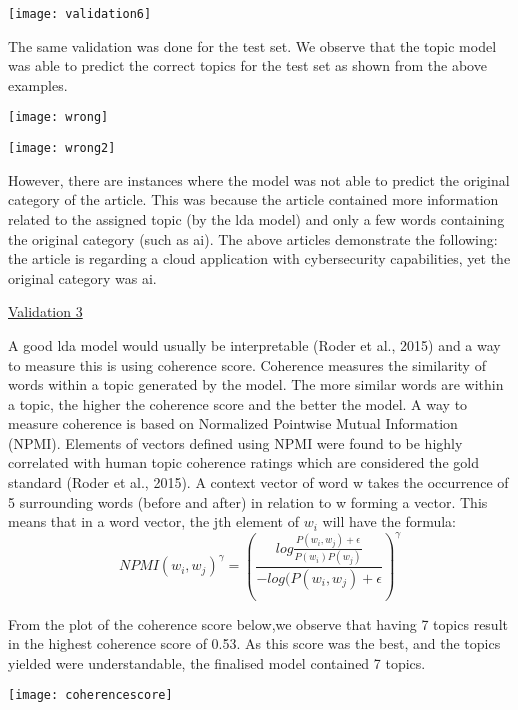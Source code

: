 \documentclass{article}
\begin{document}
\begin{titlepage}
\begin{itemize}
            \begin{center}
\texttt{[image: validation6]}
\end{center} 
            
            \quad The same validation was done for the test set. We observe that the topic model was able to predict the correct topics for the test set as shown from the above examples.
            
                \begin{center}
\texttt{[image: wrong]}
\end{center} 

    \begin{center}
\texttt{[image: wrong2]}
\end{center} 

			\quad However, there are instances where the model was not able to predict the original category of the article. This was because the article contained  more information related to the assigned topic (by the lda model) and only a few words containing the original category (such as ai).  The above articles demonstrate the following: the article is regarding a cloud application with cybersecurity capabilities, yet the original category was ai.
            
          \pagebreak
            
\underline{Validation 3}  
               
            \quad A good lda model would usually be interpretable (Roder et al., 2015) and a way to measure this is using coherence score. Coherence measures the similarity of words within a topic generated by the model. The more similar words are within a topic, the higher the coherence score and the better the model.
            \quad A way to measure coherence is based on Normalized Pointwise Mutual Information (NPMI).  Elements of vectors defined using NPMI were found to be highly correlated with human topic coherence ratings which are considered the gold standard (Roder et al., 2015). A context vector of word w takes the occurrence of 5 surrounding words (before and after) in relation to w forming a vector. This means that in a word vector, the jth element of $w_i$ will have the formula:
            $$NPMI(w_i,w_j)^\gamma   = ( \frac{log \frac{P(w_i,w_j) +\epsilon}{P(w_i)P(w_j)}}{-log(P(w_i,w_j) +\epsilon})^\gamma$$     

		\quad From the plot of the coherence score below,we observe that having 7 topics result in the highest coherence score of 0.53. As this score was the best, and the topics yielded were understandable, the finalised model contained 7 topics.
\begin{center}		
\texttt{[image: coherencescore]}
\end{center}
 

\end{itemize}
\end{titlepage}
\end{document}
